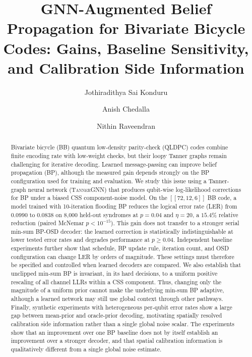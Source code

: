 \documentclass[a4paper,twocolumn,11pt,nopdfoutputerror]{quantumarticle}
\title{GNN-Augmented Belief Propagation for Bivariate Bicycle Codes: Gains, Baseline Sensitivity, and Calibration Side Information}
\author{Jothiradithya Sai Konduru}
\affiliation{Paradise Valley High School, Phoenix, AZ, USA}
\author{Anish Chedalla}
\affiliation{Paradise Valley High School, Phoenix, AZ, USA}
\author{Nithin Raveendran}
\affiliation{Department of Electrical and Computer Engineering,
             University of Arizona, Tucson, AZ, USA}
\newcommand{\code}[3]{\ensuremath{[\![#1,#2,#3]\!]}}
\begin{document}
\maketitle

\begin{abstract}
Bivariate bicycle (BB) quantum low-density parity-check (QLDPC) codes
combine finite encoding rate with low-weight checks, but their loopy
Tanner graphs remain challenging for iterative decoding. Learned
message-passing can improve belief propagation (BP), although the
measured gain depends strongly on the BP configuration used for
training and evaluation. We study this issue using a Tanner-graph
neural network (\textsc{TannerGNN}) that produces qubit-wise log-likelihood
corrections for BP under a biased CSS component-noise model. On the
$\code{72}{12}{6}$ BB code, a model trained with 10-iteration flooding
BP reduces the logical error rate (LER) from $0.0990$ to $0.0838$ on
8{,}000 held-out syndromes at $p=0.04$ and $\eta=20$, a $15.4\%$
relative reduction (paired McNemar $p<10^{-15}$). This gain does not
transfer to a stronger serial min-sum BP-OSD decoder: the learned
correction is statistically indistinguishable at lower tested error
rates and degrades performance at $p\geq 0.04$. Independent baseline
experiments further show that schedule, BP update rule, iteration count,
and OSD configuration can change LER by orders of magnitude. These
settings must therefore be specified and controlled when learned decoders
are compared.
We also establish that unclipped min-sum BP is invariant, in its hard
decisions, to a uniform positive rescaling of all channel LLRs within a
CSS component. Thus, changing only the magnitude of a uniform prior
cannot make the underlying min-sum BP adaptive, although a learned
network may still use global context through other pathways. Finally,
synthetic experiments with heterogeneous per-qubit error rates show a
large gap between mean-prior and oracle-prior decoding, motivating
spatially resolved calibration side information rather than a single
global noise scalar. The experiments show that an improvement over one BP baseline does not
by itself establish an improvement over a stronger decoder, and that
spatial calibration information is qualitatively different from a single
global noise estimate.
\end{abstract}

\end{document}
